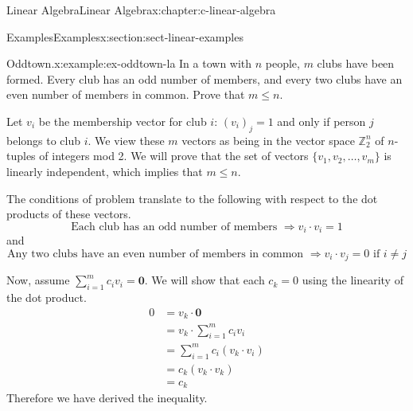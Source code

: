 \documentclass[twoside,10pt,]{book}
\numberwithin{equation}{section}
\renewcommand{\vec}[1]{\mathbf{#1}}
\begin{document}
\begin{chapterptx}{Linear Algebra}{}{Linear Algebra}{}{}{x:chapter:c-linear-algebra}
%
%
\typeout{************************************************}
\typeout{************************************************}
%
\begin{sectionptx}{Examples}{}{Examples}{}{}{x:section:sect-linear-examples}
\begin{example}{Oddtown.}{x:example:ex-oddtown-la}%
In a town with \(n\) people, \(m\) clubs have been formed. Every club has an odd number of members, and every two clubs have an even number of members in common. Prove that \(m \leq  n\).%
\par
Let \(v_i\) be the membership vector for club \(i\):  \((v_i)_j = 1\) and only if person  \(j\) belongs to club \(i\). We view these \(m\) vectors as being in the vector space \(\mathbb{Z}_2^n\) of \(n\)-tuples of integers mod 2.  We will prove that the set of vectors \(\{v_1, v_2, \dots, v_m\}\) is linearly independent, which implies that \(m \leq  n\).%
\par
The conditions of problem translate to the following with respect to the dot products of these vectors.%
\begin{equation*}
\textrm{Each club has an odd number of members }\Rightarrow  v_i\cdot v_i = 1
\end{equation*}
and%
\begin{equation*}
\textrm{Any two clubs have an even number of members in common }\Rightarrow  v_i\cdot v_j = 0 \textrm{ if }i\neq j
\end{equation*}
%
\par
Now, assume  \(\sum_{i=1}^m c_i v_i = \vec{0}\).  We will show that each \(c_k = 0\) using the linearity of the dot product.%
\begin{equation*}
\begin{split}
0 & = v_k \cdot \vec{0}\\
& = v_k \cdot \sum_{i=1}^m c_i v_i\\
& = \sum_{i=1}^m c_i (v_k \cdot v_i)\\
& = c_k (v_k \cdot v_k)\\
& = c_k
\end{split}
\end{equation*}
Therefore we have derived the inequality.%
\end{example}
\end{sectionptx}
%
%
\typeout{************************************************}
\typeout{************************************************}

\end{chapterptx}
\end{document}
